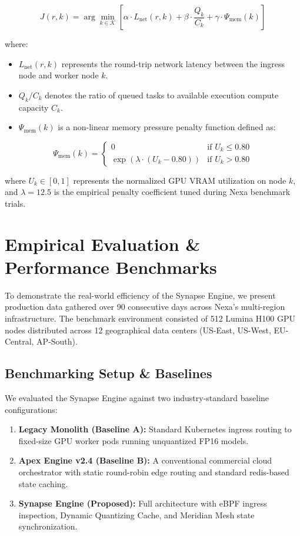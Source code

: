 \documentclass[10pt, a4paper]{article}
\begin{document}
\begin{equation}
J(r, k) = \arg\min_{k \in \mathcal{K}} \left[ \alpha \cdot L_{\text{net}}(r, k) + \beta \cdot \frac{Q_k}{C_k} + \gamma \cdot \Psi_{\text{mem}}(k) \right]
\end{equation}

where:
\begin{itemize}[leftmargin=2em]
  \item $L_{\text{net}}(r, k)$ represents the round-trip network latency between the ingress node and worker node $k$.
  \item $Q_k / C_k$ denotes the ratio of queued tasks to available execution compute capacity $C_k$.
  \item $\Psi_{\text{mem}}(k)$ is a non-linear memory pressure penalty function defined as:
\end{itemize}

\begin{equation}
\Psi_{\text{mem}}(k) = \begin{cases}
  0 & \text{if } U_k \le 0.80 \\
  \exp\left( \lambda \cdot (U_k - 0.80) \right) & \text{if } U_k > 0.80
\end{cases}
\end{equation}

where $U_k \in [0, 1]$ represents the normalized GPU VRAM utilization on node $k$, and $\lambda = 12.5$ is the empirical penalty coefficient tuned during Nexa benchmark trials.

\vspace{10pt}

\section{Empirical Evaluation \& Performance Benchmarks}

To demonstrate the real-world efficiency of the Synapse Engine, we present production data gathered over 90 consecutive days across Nexa's multi-region infrastructure. The benchmark environment consisted of 512 Lumina H100 GPU nodes distributed across 12 geographical data centers (US-East, US-West, EU-Central, AP-South).

\subsection{Benchmarking Setup \& Baselines}
We evaluated the Synapse Engine against two industry-standard baseline configurations:
\begin{enumerate}[label=\arabic*.]
  \item \textbf{Legacy Monolith (Baseline A):} Standard Kubernetes ingress routing to fixed-size GPU worker pods running unquantized FP16 models.
  \item \textbf{Apex Engine v2.4 (Baseline B):} A conventional commercial cloud orchestrator with static round-robin edge routing and standard redis-based state caching.
  \item \textbf{Synapse Engine (Proposed):} Full architecture with eBPF ingress inspection, Dynamic Quantizing Cache, and Meridian Mesh state synchronization.
\end{enumerate}
\end{document}
